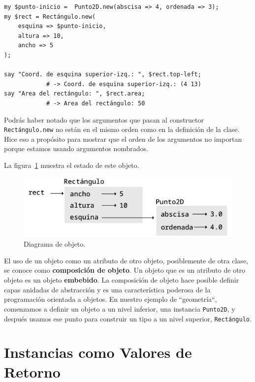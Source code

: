 \begin{lstlisting}
my $punto-inicio =  Punto2D.new(abscisa => 4, ordenada => 3);
my $rect = Rectángulo.new(
	esquina => $punto-inicio, 
	altura => 10, 
	ancho => 5
);

say "Coord. de esquina superior-izq.: ", $rect.top-left;   
			# -> Coord. de esquina superior-izq.: (4 13)
say "Area del rectángulo: ", $rect.area;      
			# -> Area del rectángulo: 50
\end{lstlisting}


Podrás haber notado que los argumentos que pasan al 
constructor {\tt Rectángulo.new} no están en el mismo 
orden como en la definición de la clase. Hice eso a 
propósito para mostrar que el orden de los argumentos
no importan porque estamos usando argumentos nombrados.

La figura~\ref{fig.rectangle} muestra el estado de este objeto.

\begin{figure}
\centerline
{\includegraphics[scale=0.7]{figs/rectangle.pdf}}
\caption{Diagrama de objeto.}
\label{fig.rectangle}
\end{figure}


El uso de un objeto como un atributo de otro objeto, posiblemente
de otra clase, se conoce como {\bf composición de objeto}. 
Un objeto que es un atributo de otro objeto es un objeto 
{\bf embebido}. La composición de objeto hace posible 
definir capas anidadas de abstracción y es una característica
poderosa de la programación orientada a objetos. En nuestro 
ejemplo de ``geometría``, comenzamos a definir un objeto 
a un nivel inferior, una instancia {\tt Punto2D}, y después usamos
ese punto para construir un tipo a un nivel superior, {\tt Rectángulo}.


\section{Instancias como Valores de Retorno}

